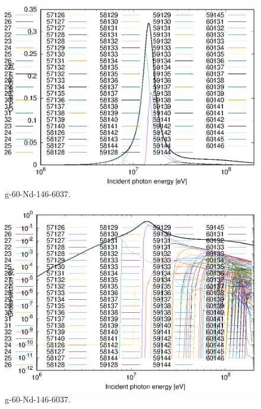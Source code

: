 \begin{figure}
 \includegraphics[width=\linewidth]{eps/g_60-Nd-146_6037.eps}
  \caption{g-60-Nd-146-6037.}
\end{figure}
\begin{figure}
 \includegraphics[width=\linewidth]{eps-log/g_60-Nd-146_6037.eps}
 \caption{g-60-Nd-146-6037.}
\end{figure}
\newpage \clearpage

